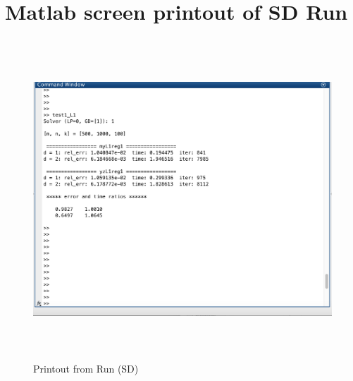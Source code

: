 \clearpage
\section*{Matlab screen printout of SD Run}
\begin{figure}[H]
\centering
\includegraphics[height=12cm]{SD}
\caption{Printout from Run (SD)}
\end{figure}

\clearpage

